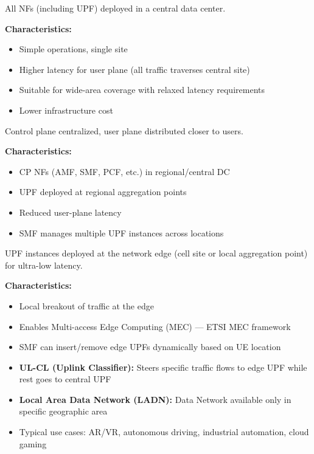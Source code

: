 
All NFs (including UPF) deployed in a central data center.

\textbf{Characteristics:}

\begin{itemize}
\tightlist
\item
  Simple operations, single site
\item
  Higher latency for user plane (all traffic traverses central site)
\item
  Suitable for wide-area coverage with relaxed latency requirements
\item
  Lower infrastructure cost
\end{itemize}


Control plane centralized, user plane distributed closer to users.

\textbf{Characteristics:}

\begin{itemize}
\tightlist
\item
  CP NFs (AMF, SMF, PCF, etc.) in regional/\allowbreak{}central DC
\item
  UPF deployed at regional aggregation points
\item
  Reduced user-plane latency
\item
  SMF manages multiple UPF instances across locations
\end{itemize}


UPF instances deployed at the network edge (cell site or local aggregation point) for ultra-low latency.

\textbf{Characteristics:}

\begin{itemize}
\tightlist
\item
  Local breakout of traffic at the edge
\item
  Enables Multi-access Edge Computing (MEC) — ETSI MEC framework
\item
  SMF can insert/\allowbreak{}remove edge UPFs dynamically based on UE location
\item
  \textbf{UL-CL (Uplink Classifier):} Steers specific traffic flows to edge UPF while rest goes to central UPF
\item
  \textbf{Local Area Data Network (LADN):} Data Network available only in specific geographic area
\item
  Typical use cases: AR/\allowbreak{}VR, autonomous driving, industrial automation, cloud gaming
\end{itemize}

